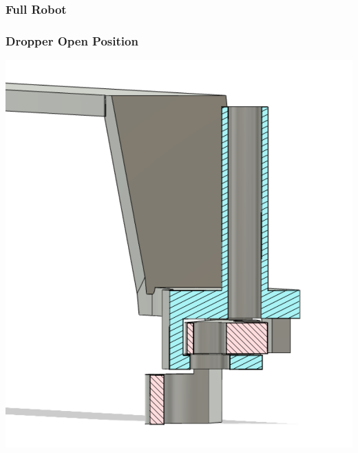 \documentclass[11pt, hidelinks]{report}
\begin{document}
\subsubsection{Full Robot} \label{app:robot}
	\begin{center}
	\end{center}

\subsubsection{Dropper Open Position} \label{app:dropopen}
	\begin{center}
	    \includegraphics[scale=.2]{dropopen.png}
	\end{center}
\end{document}
